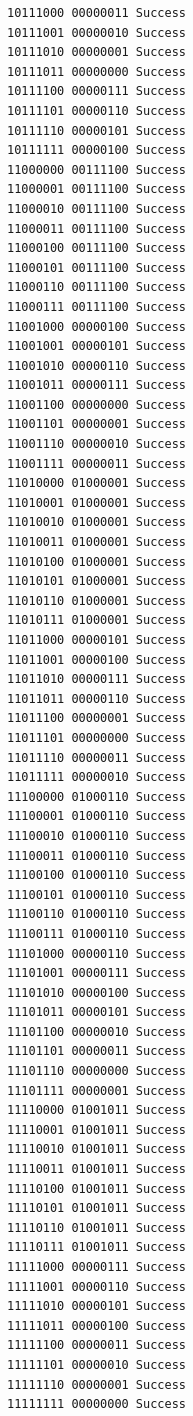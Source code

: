 \documentclass[12pt]{article}
\begin{document}
\begin{verbatim}
10111000 00000011 Success
10111001 00000010 Success
10111010 00000001 Success
10111011 00000000 Success
10111100 00000111 Success
10111101 00000110 Success
10111110 00000101 Success
10111111 00000100 Success
11000000 00111100 Success
11000001 00111100 Success
11000010 00111100 Success
11000011 00111100 Success
11000100 00111100 Success
11000101 00111100 Success
11000110 00111100 Success
11000111 00111100 Success
11001000 00000100 Success
11001001 00000101 Success
11001010 00000110 Success
11001011 00000111 Success
11001100 00000000 Success
11001101 00000001 Success
11001110 00000010 Success
11001111 00000011 Success
11010000 01000001 Success
11010001 01000001 Success
11010010 01000001 Success
11010011 01000001 Success
11010100 01000001 Success
11010101 01000001 Success
11010110 01000001 Success
11010111 01000001 Success
11011000 00000101 Success
11011001 00000100 Success
11011010 00000111 Success
11011011 00000110 Success
11011100 00000001 Success
11011101 00000000 Success
11011110 00000011 Success
11011111 00000010 Success
11100000 01000110 Success
11100001 01000110 Success
11100010 01000110 Success
11100011 01000110 Success
11100100 01000110 Success
11100101 01000110 Success
11100110 01000110 Success
11100111 01000110 Success
11101000 00000110 Success
11101001 00000111 Success
11101010 00000100 Success
11101011 00000101 Success
11101100 00000010 Success
11101101 00000011 Success
11101110 00000000 Success
11101111 00000001 Success
11110000 01001011 Success
11110001 01001011 Success
11110010 01001011 Success
11110011 01001011 Success
11110100 01001011 Success
11110101 01001011 Success
11110110 01001011 Success
11110111 01001011 Success
11111000 00000111 Success
11111001 00000110 Success
11111010 00000101 Success
11111011 00000100 Success
11111100 00000011 Success
11111101 00000010 Success
11111110 00000001 Success
11111111 00000000 Success
\end{verbatim}
\end{document}
